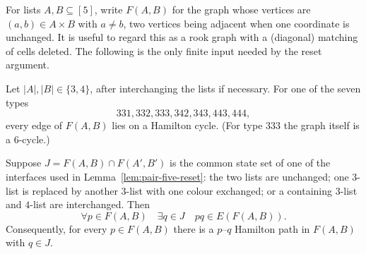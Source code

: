 
For lists $A,B\subseteq[5]$, write $F(A,B)$ for the graph whose vertices are
$(a,b)\in A\times B$ with $a\ne b$, two vertices being adjacent when one
coordinate is unchanged.  It is useful to regard this as a rook graph with a
(diagonal) matching of cells deleted.  The following is the only finite input
needed by the reset argument.

\begin{lemma}
\label{lem:pair-five-edge-cycles}
Let $|A|,|B|\in\{3,4\}$, after interchanging the lists if necessary.  For
one of the seven types
\[
331,332,333,342,343,443,444,
\]
every edge of $F(A,B)$ lies on a Hamilton cycle.  (For type $333$ the graph
itself is a $6$-cycle.)

Suppose $J=F(A,B)\cap F(A',B')$ is the common state set of one of the
interfaces used in Lemma~\ref{lem:pair-five-reset}: the two lists are
unchanged; one $3$-list is replaced by another $3$-list with one colour
exchanged; or a containing $3$-list and $4$-list are interchanged.  Then
\[
  \forall p\in F(A,B)\quad \exists q\in J\quad pq\in E(F(A,B)).
\]
Consequently, for every $p\in F(A,B)$ there is a $p$--$q$ Hamilton path in
$F(A,B)$ with $q\in J$.
\end{lemma}

